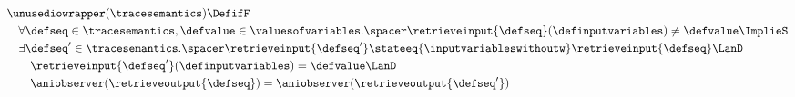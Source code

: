 \begin{align*}
  &\unusediowrapper(\tracesemantics) \DefifF \\
  &\quad\forall
    \defseq\in\tracesemantics, \defvalue\in\valuesofvariables
  .\spacer
    \retrieveinput{\defseq}(\definputvariables) \neq \defvalue \ImplieS \\
    &\quad\exists
      \defseq'\in\tracesemantics
    .\spacer
      \retrieveinput{\defseq'} \stateeq{\inputvariableswithoutw} \retrieveinput{\defseq}
      \LanD \\
    &\quad\quad
      \retrieveinput{\defseq'}(\definputvariables) = \defvalue
      \LanD \\
    &\quad\quad
      \aniobserver(\retrieveoutput{\defseq}) = \aniobserver(\retrieveoutput{\defseq'})
\end{align*}
